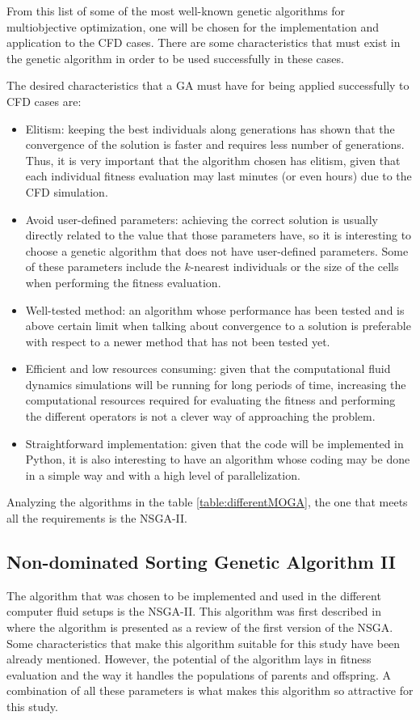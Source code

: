 From this list of some of the most well-known genetic algorithms for multiobjective optimization, one will be chosen for the implementation and application to the CFD cases. There are some characteristics that must exist in the genetic algorithm in order to be used successfully in these cases.

\newpage

The desired characteristics that a GA  must have for being applied successfully to CFD cases are:
\begin{itemize}
    \item Elitism: keeping the best individuals along generations has shown that the convergence of the solution is faster and requires less number of generations. Thus, it is very important that the algorithm chosen has elitism, given that each individual fitness evaluation may last minutes (or even hours) due to the CFD simulation. 
    \item Avoid user-defined parameters: achieving the correct solution is usually directly related to the value that those parameters have, so it is interesting to choose a genetic algorithm that does not have user-defined parameters. Some of these parameters include the $k$-nearest individuals or the size of the cells when performing the fitness evaluation. 
    \item Well-tested method: an algorithm whose performance has been tested and is above certain limit when talking about convergence to a solution is preferable with respect to a newer method that has not been tested yet. 
    \item Efficient and low resources consuming: given that the computational fluid dynamics simulations will be running for long periods of time, increasing the computational resources required for evaluating the fitness and performing the different operators is not a clever way of approaching the problem.
    \item Straightforward implementation: given that the code will be implemented in Python, it is also interesting to have an algorithm whose coding may be done in a simple way and with a high level of parallelization.
\end{itemize}
Analyzing the algorithms in the table \ref{table:differentMOGA}, the one that meets all the requirements is the NSGA-II. 

\subsection{Non-dominated Sorting Genetic Algorithm II}
The algorithm that was chosen to be implemented and used in the different computer fluid setups is the NSGA-II. This algorithm was first described in \cite{deb2002fast} where the algorithm is presented as a review of the first version of the NSGA. Some characteristics that make this algorithm suitable for this study have been already mentioned. However, the potential of the algorithm lays in fitness evaluation and the way it handles the populations of parents and offspring. A combination of all these parameters is what makes this algorithm so attractive for this study. 

